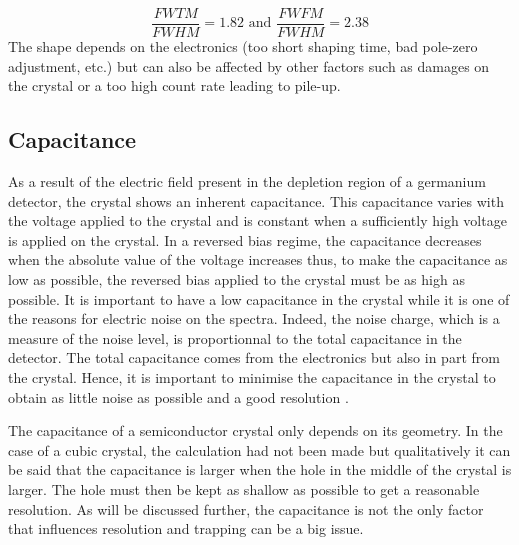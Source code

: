 \documentclass[11pt,a4paper]{article}
\begin{document}
\begin{equation}
\dfrac{FWTM}{FWHM} = 1.82 \text{  and  } \dfrac{FWFM}{FWHM} = 2.38
\end{equation}
The shape depends on the electronics (too short shaping time, bad pole-zero adjustment, etc.) but can also be affected by other factors such as damages on the crystal or a too high count rate leading to pile-up.


\subsection{Capacitance}

As a result of the electric field present in the depletion region of a germanium detector, the crystal shows an inherent capacitance. This capacitance varies with the voltage applied to the crystal and is constant when a sufficiently high voltage is applied on the crystal. In a reversed bias regime, the capacitance decreases when the absolute value of the voltage increases thus, to make the capacitance as low as possible, the reversed bias applied to the crystal must be as high as possible. It is important to have a low capacitance in the crystal while it is one of the reasons for electric noise on the spectra. Indeed, the noise charge, which is a measure of the noise level, is proportionnal to the total capacitance in the detector. The total capacitance comes from the electronics but also in part from the crystal. Hence, it is important to minimise the capacitance in the crystal to obtain as little noise as possible and a good resolution \cite{Kephart}.

The capacitance of a semiconductor crystal only depends on its geometry. In the case of a cubic crystal, the calculation had not been made but qualitatively it can be said that the capacitance is larger when the hole in the middle of the crystal is larger. The hole must then be kept as shallow as possible to get a reasonable resolution. As will be discussed further, the capacitance is not the only factor that influences resolution and trapping can be a big issue.
\end{document}

